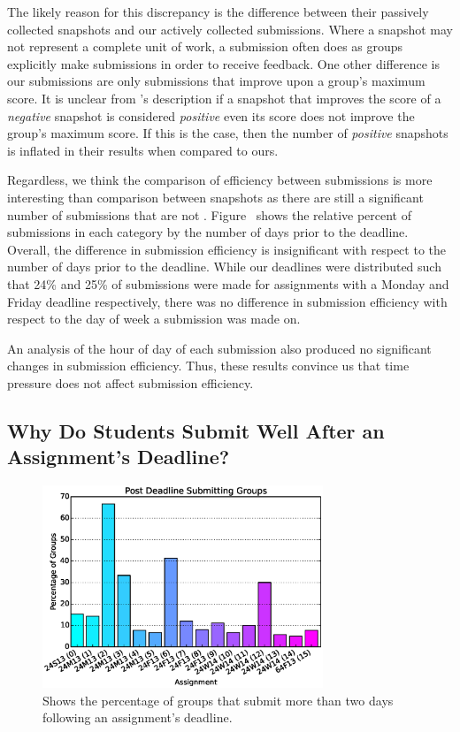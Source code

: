 The likely reason for this discrepancy is the difference between their
passively collected snapshots and our actively collected submissions. Where a
snapshot may not represent a complete unit of work, a submission often does as
groups explicitly make submissions in order to receive feedback. One other
difference is our \imp{} submissions are only submissions that improve upon a
group's maximum score. It is unclear from \spacco{}'s description if a snapshot
that improves the score of a \emph{negative} snapshot is considered
\emph{positive} even its score does not improve the group's maximum score. If
this is the case, then the number of \emph{positive} snapshots is inflated in
their results when compared to ours.

Regardless, we think the comparison of efficiency between submissions is more
interesting than comparison between snapshots as there are still a significant
number of submissions that are not
\imp{}. Figure~ shows the relative percent of
submissions in each category by the number of days prior to the
deadline. Overall, the difference in submission efficiency is insignificant
with respect to the number of days prior to the deadline. While our deadlines
were distributed such that 24\% and 25\% of submissions were made for
assignments with a Monday and Friday deadline respectively, there was no
difference in submission efficiency with respect to the day of week a
submission was made on.

An analysis of the hour of day of each submission also produced no significant
changes in submission efficiency. Thus, these results convince us that time
pressure does not affect submission efficiency.

\subsection{Why Do Students Submit Well After an Assignment's Deadline?}

\begin{figure}[!t]
\centering
\includegraphics[width=3.3in]{graphs/Post_Deadline_Submitting_Groups.eps}
\caption{Shows the percentage of groups that submit more than two days
  following an assignment's deadline.}
\end{figure}

